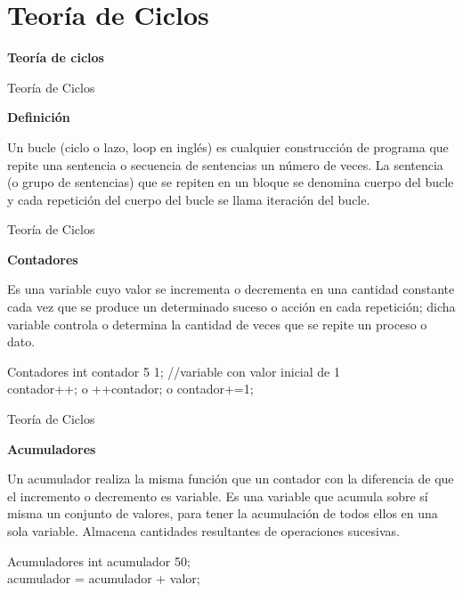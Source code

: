 \setlength{\parskip}{\baselineskip}
\section*{Teoría de Ciclos}

\begin{frame}[c] 
\centering
\huge \textbf{Teoría de ciclos}
\end{frame}

\begin{frame}{Teoría de Ciclos}
    \begin{center}\textbf{Definición}\end{center}
    \justify
    \hspace{5mm}
    Un bucle (ciclo o lazo, loop en inglés) es cualquier construcción de programa que
    repite una sentencia o secuencia de sentencias un número de veces. La sentencia (o
    grupo de sentencias) que se repiten en un bloque se denomina cuerpo del bucle y
    cada repetición del cuerpo del bucle se llama iteración del bucle.
\end{frame}


\begin{frame}{Teoría de Ciclos}
    \begin{center}\textbf{Contadores}\end{center}
    \vspace{-2mm}
    Es una variable cuyo valor se incrementa o decrementa en una cantidad constante cada vez que se produce un determinado suceso o acción en cada repetición; dicha variable controla o determina la cantidad de veces que se repite un proceso o dato.
    \begin{block}{Contadores}
        int contador 5 1; //variable con valor inicial de 1\\
        contador++; o ++contador; o contador+=1;
    \end{block}
\end{frame}


\begin{frame}{Teoría de Ciclos}
    \vspace{-1mm}
    \begin{center}\textbf{Acumuladores}\end{center}
    \vspace{-3mm}
    Un acumulador realiza la misma función que un contador con la diferencia de que el incremento o decremento es variable. Es una variable que acumula sobre sí misma un conjunto de valores, para tener la acumulación de todos ellos en una sola variable. Almacena cantidades resultantes de operaciones sucesivas.
    \begin{block}{Acumuladores}
        int acumulador 50;\\
        acumulador = acumulador + valor;
    \end{block}
\end{frame}



